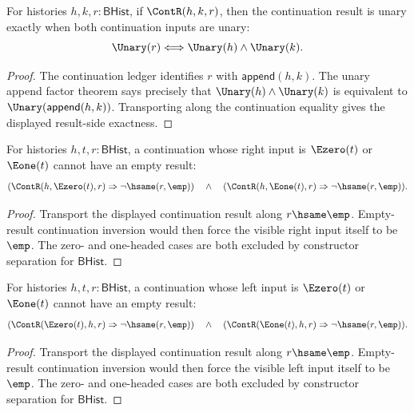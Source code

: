 \begin{theorem}
\label{thm:concrete-unary-history-magma-cont-result-unary}
For histories $h,k,r:\mathsf{BHist}$, if $\ContR(h,k,r)$, then the
continuation result is unary exactly when both continuation inputs are unary:
$$
\Unary(r)\Longleftrightarrow \Unary(h)\land\Unary(k).
$$
\end{theorem}
\begin{proof}
The continuation ledger identifies $r$ with $\mathsf{append}(h,k)$. The
unary append factor theorem says precisely that
$\Unary(h)\land\Unary(k)$ is equivalent to
$\Unary(\mathsf{append}(h,k))$. Transporting along the continuation equality
gives the displayed result-side exactness.
\end{proof}

\begin{theorem}
\label{thm:concrete-unary-history-magma-cont-visible-right-result-nonempty}
For histories \(h,t,r:\mathsf{BHist}\), a continuation whose right input is
\(\Ezero(t)\) or \(\Eone(t)\) cannot have an empty result:
$$
(\ContR(h,\Ezero(t),r)\Rightarrow\neg\hsame(r,\emp))
\quad\wedge\quad
(\ContR(h,\Eone(t),r)\Rightarrow\neg\hsame(r,\emp)).
$$
\end{theorem}
\begin{proof}
Transport the displayed continuation result along \(r\hsame\emp\). Empty-result
continuation inversion would then force the visible right input itself to be
\(\emp\). The zero- and one-headed cases are both excluded by constructor
separation for \(\mathsf{BHist}\).
\end{proof}

\begin{theorem}
\label{thm:concrete-unary-history-magma-cont-visible-left-result-nonempty}
For histories \(h,t,r:\mathsf{BHist}\), a continuation whose left input is
\(\Ezero(t)\) or \(\Eone(t)\) cannot have an empty result:
$$
(\ContR(\Ezero(t),h,r)\Rightarrow\neg\hsame(r,\emp))
\quad\wedge\quad
(\ContR(\Eone(t),h,r)\Rightarrow\neg\hsame(r,\emp)).
$$
\end{theorem}
\begin{proof}
Transport the displayed continuation result along \(r\hsame\emp\). Empty-result
continuation inversion would then force the visible left input itself to be
\(\emp\). The zero- and one-headed cases are both excluded by constructor
separation for \(\mathsf{BHist}\).
\end{proof}

